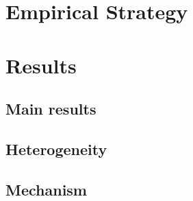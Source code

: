 \documentclass[11pt,a4paper]{article}
\begin{document}
\section{Empirical Strategy}
\label{sec:empirical}

\section{Results}
\label{sec:results}

\subsection{Main results}

\subsection{Heterogeneity}

\subsection{Mechanism}

\end{document}

